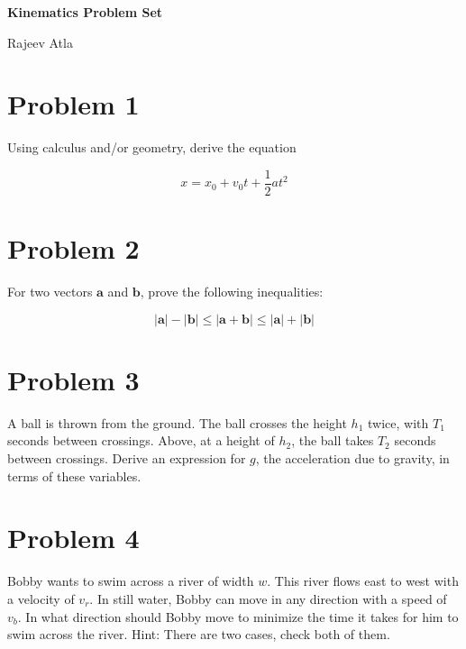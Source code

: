 \documentclass[11pt]{scrartcl}
\begin{document}
\titleformat{\section}{\normalfont\Large\bfseries}{\color{red}\S \thesection}{0.5em}{}
\titleformat{\subsection}{\normalfont\Large\bfseries}{\color{olive}\S \thesubsection}{0.5em}{}
\titleformat{\subsubsection}{\normalfont\Large\bfseries}{\color{blue}\S \thesubsubsection}{0.5em}{}

\begin{center}
    \Large \textbf{Kinematics Problem Set}
\end{center}
\begin{center}
    \Large Rajeev Atla
\end{center}

\newpage

\section{Problem 1}
Using calculus and/or geometry, derive the equation

$$
x = x_0 + v_0 t + \frac{1}{2} at^2
$$

\section{Problem 2}
For two vectors $\bm{a}$ and $\bm{b}$, prove the following inequalities:

$$
|\bm{a}| - |\bm{b}| \leq |\bm{a}+\bm{b}| \leq |\bm{a}|+ |\bm{b}|
$$

\section{Problem 3}
A ball is thrown from the ground.
The ball crosses the height $h_1$ twice, with $T_1$ seconds between crossings.
Above, at a height of $h_2$, the ball takes $T_2$ seconds between crossings.
Derive an expression for $g$, the acceleration due to gravity, in terms of these variables.

\section{Problem 4}
Bobby wants to swim across a river of width $w$.
This river flows east to west with a velocity of $v_r$.
In still water, Bobby can move in any direction with a speed of $v_b$.
In what direction should Bobby move to minimize the time it takes for him to swim across the river.
Hint: There are two cases, check both of them.
\end{document}
